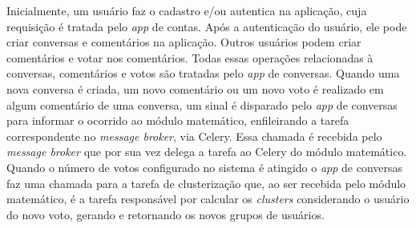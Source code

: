 	Inicialmente, um usuário faz o cadastro e/ou autentica na aplicação,
	cuja requisição é tratada pelo \textit{app} de contas.
	Após a autenticação do usuário, ele pode criar conversas e comentários na aplicação.
	Outros usuários podem criar comentários e votar nos comentários.
	Todas essas operações relacionadas à conversas, comentários e votos
	são tratadas pelo \textit{app} de conversas.
	Quando uma nova conversa é criada, um novo comentário ou um novo voto é realizado
	em algum comentário de uma conversa, um sinal é disparado pelo \textit{app} de conversas
	para informar o ocorrido ao módulo matemático, enfileirando a tarefa correspondente
	no \textit{message broker}, via Celery.
	Essa chamada é recebida pelo \textit{message broker} que por sua vez delega
	a tarefa ao Celery do módulo matemático.
	Quando o número de votos configurado no sistema é atingido o \textit{app} de conversas
	faz uma chamada para a tarefa de clusterização que, ao ser recebida pelo módulo matemático,
	é a tarefa responsável por calcular os \textit{clusters} considerando o usuário do novo voto,
	gerando e retornando os novos grupos de usuários.